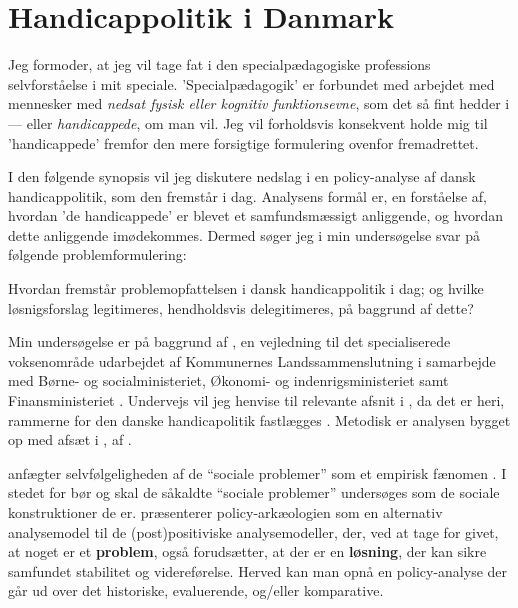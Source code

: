 \section{Handicappolitik i Danmark}

Jeg formoder, at jeg vil tage fat i den specialpædagogiske professions selvforståelse i mit speciale.
'Specialpædagogik' er forbundet med arbejdet med mennesker med \textit{nedsat fysisk eller kognitiv funktionsevne}, som det så fint hedder i  — eller \textit{handicappede}, om man vil. Jeg vil forholdsvis konsekvent holde mig til 'handicappede' fremfor den mere forsigtige formulering ovenfor fremadrettet.

I den følgende synopsis vil jeg diskutere nedslag i en policy-analyse af dansk handicappolitik, som den fremstår i dag.
Analysens formål er, en forståelse af, hvordan 'de handicappede' er blevet et samfundsmæssigt anliggende, og hvordan dette anliggende imødekommes.
Dermed søger jeg i min undersøgelse svar på følgende problemformulering:

Hvordan fremstår problemopfattelsen i dansk handicappolitik i dag; og hvilke løsnigsforslag legitimeres, hendholdsvis delegitimeres, på baggrund af dette?

Min undersøgelse er på baggrund af , en vejledning til det specialiserede voksenområde udarbejdet af Kommunernes Landssammenslutning i samarbejde med Børne- og socialministeriet, Økonomi- og indenrigsministeriet samt Finansministeriet \autocite{klStyringAfDet2017}.
Undervejs vil jeg henvise til relevante afsnit i , da det er heri, rammerne for den danske handicapolitik fastlægges \autocite[§ ??]{social-ogindenrigsministerietBekendtgorelseAfLov2019}. 
Metodisk er analysen bygget op med afsæt i , af \citeauthor{scheurichPolicyArchaeologyNew1994}.

\citeauthor{scheurichPolicyArchaeologyNew1994} anfægter selvfølgeligheden af de “sociale problemer” som et empirisk fænomen \autocite[s. ??]{scheurichPolicyArchaeologyNew1994}.
I stedet for bør og skal de såkaldte “sociale problemer” undersøges som de sociale konstruktioner de er.
\citeauthor{scheurichPolicyArchaeologyNew1994} præsenterer policy-arkæologien som en alternativ analysemodel til de (post)positiviske analysemodeller, der, ved at tage for givet, at noget er et \textbf{problem}, også forudsætter, at der er en \textbf{løsning}, der kan sikre samfundet stabilitet og videreførelse.
Herved kan man opnå en policy-analyse der går ud over det historiske, evaluerende, og/eller komparative.


